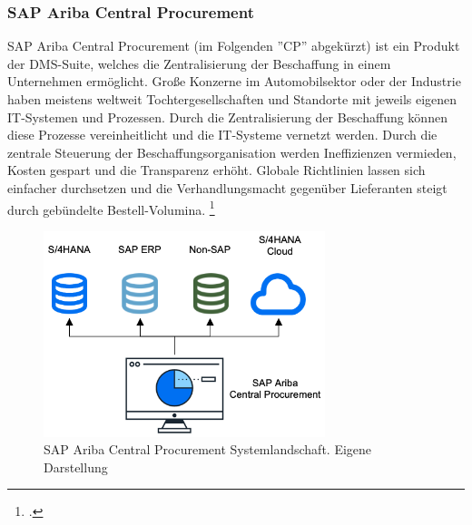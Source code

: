 \subsubsection{SAP Ariba Central Procurement}

SAP Ariba Central Procurement (im Folgenden ''CP'' abgekürzt) ist ein Produkt der DMS-Suite, welches die Zentralisierung der Beschaffung in einem Unternehmen ermöglicht. Gro\ss e Konzerne im Automobilsektor oder der Industrie haben meistens weltweit Tochtergesellschaften und Standorte mit jeweils eigenen IT-Systemen und Prozessen. Durch die Zentralisierung der Beschaffung können diese Prozesse vereinheitlicht und die IT-Systeme vernetzt werden. Durch die zentrale Steuerung der Beschaffungsorganisation werden Ineffizienzen vermieden, Kosten gespart und die Transparenz erhöht. Globale Richtlinien lassen sich einfacher durchsetzen und die Verhandlungsmacht gegenüber Lieferanten steigt durch gebündelte Bestell-Volumina. \footcite[Vgl.][]{theorie_sap_central_procurement_overview_2024}

\begin{figure}[H]
    \centering
    \includegraphics[height=6cm]{Bilder/Central_Procurement_System_Landscape.png}
    \caption[SAP Ariba Central Procurement Systemlandschaft]{SAP Ariba Central Procurement Systemlandschaft. Eigene Darstellung}
    \label{fig:iso_norm}
\end{figure}

